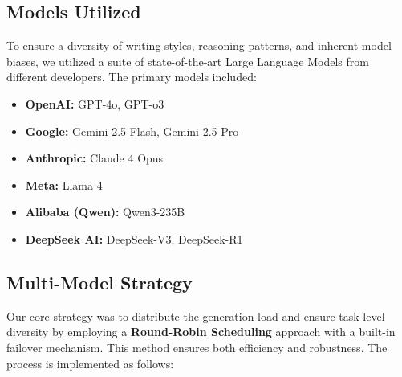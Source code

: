 \documentclass[letterpaper]{article} %
\begin{document}
\subsection{Models Utilized}
To ensure a diversity of writing styles, reasoning patterns, and inherent model biases, we utilized a suite of state-of-the-art Large Language Models from different developers. The primary models included:
\begin{itemize}
    \item \textbf{OpenAI:}
    GPT-4o, GPT-o3

    \item \textbf{Google:}
    Gemini 2.5 Flash, Gemini 2.5 Pro

    \item \textbf{Anthropic:}
    Claude 4 Opus

    \item \textbf{Meta:}
    Llama 4 

    \item \textbf{Alibaba (Qwen):}
    Qwen3-235B

    \item \textbf{DeepSeek AI:}
    DeepSeek-V3, DeepSeek-R1


    

\end{itemize}

\subsection{Multi-Model Strategy}
Our core strategy was to distribute the generation load and ensure task-level diversity by employing a \textbf{Round-Robin Scheduling} approach with a built-in failover mechanism. This method ensures both efficiency and robustness. The process is implemented as follows:
\end{document}

